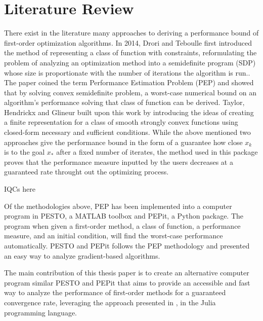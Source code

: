  \chapter{Literature Review}

There exist in the literature many approaches to deriving a performance bound of first-order optimization algorithms. In 2014, Drori and Teboulle first introduced the method of representing a class of function with constraints, reformulating the problem of analyzing an optimization method into a semidefinite program (SDP) whose size is proportionate with the number of iterations the algorithm is run.\cite{drori2012}. The paper coined the term Performance Estimation Problem (PEP) and showed that by solving convex semidefinite problem, a worst-case numerical bound on an algorithm's performance solving that class of function can be derived. Taylor, Hendrickx and Glineur built upon this work by introducing the ideas of creating a finite representation for a class of smooth strongly convex functions using closed-form necessary and sufficient conditions. While the above mentioned two approaches give the performance bound in the form of a guarantee how close \(x_k\) is to the goal \(x_*\) after a fixed number of iterates, the method used in this package proves that the performance measure inputted by the users decreases at a guaranteed rate throught out the optimizing process.

IQCs here

Of the methodologies above, PEP has been implemented into a computer program in PESTO, a MATLAB toolbox and PEPit, a Python package. The program when given a first-order method, a class of function, a performance measure, and an initial condition, will find the worst-case performance automatically. PESTO and PEPit follows the PEP methodology and presented an easy way to analyze gradient-based algorithms.

The main contribution of this thesis paper is to create an alternative computer program similar PESTO and PEPit that aims to provide an accessible and fast way to analyze the performance of first-order methods for a guaranteed convergence rate, leveraging the approach presented in \cite{tutorial}, in the Julia programming language.